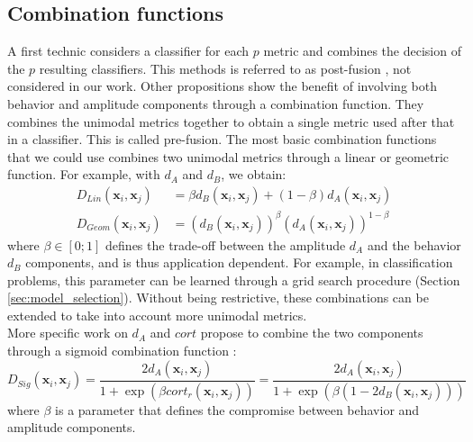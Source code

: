 \subsection{Combination functions}
A first technic considers a classifier for each $p$ metric and combines the decision of the $p$ resulting classifiers. This methods is referred to as post-fusion \cite{Zhang2013}, not considered in our work. Other propositions show the benefit of involving both behavior and amplitude components through a combination function. They combines the unimodal metrics together to obtain a single metric used after that in a classifier. This is called pre-fusion. The most basic combination functions that we could use combines two unimodal metrics through a linear or geometric function. For example, with $d_A$ and $d_B$, we obtain: 
\begin{align}
D_{Lin}(\textbf{x}_i,\textbf{x}_j) &= \beta d_{B}(\textbf{x}_i,\textbf{x}_j) + (1-\beta) d_A(\textbf{x}_i,\textbf{x}_j)  \label{eq:DLin}   \\
D_{Geom}(\textbf{x}_i,\textbf{x}_j) &= (d_{B}(\textbf{x}_i,\textbf{x}_j))^\beta  (d_A(\textbf{x}_i,\textbf{x}_j))^{1-\beta} \label{eq:DGeom}
\end{align}
\noindent where $\beta \in [0;1]$ defines the trade-off between the amplitude $d_A$ and the behavior $d_B$ components, and is thus application dependent. For example, in classification problems, this parameter can be learned through a grid search procedure (Section \ref{sec:model_selection}). Without being restrictive, these combinations can be extended to take into account more unimodal metrics. \\
More specific work on $d_A$ and $cort$ propose to combine the two components through a sigmoid combination function \cite{AhlameDouzal-Chouakria2012,Chouakria2007}:
\begin{equation}	
D_{Sig}(\textbf{x}_i,\textbf{x}_j) = \frac{2d_A(\textbf{x}_i,\textbf{x}_j)}{1+\exp(\beta cort_r(\textbf{x}_i,\textbf{x}_j))}
= \frac{2d_A(\textbf{x}_i,\textbf{x}_j)}{1+\exp(\beta (1-2d_B(\textbf{x}_i,\textbf{x}_j)))}
\label{eq:DSig}
\end{equation}
\noindent where $\beta$ is a parameter that defines the compromise between behavior and amplitude components.

